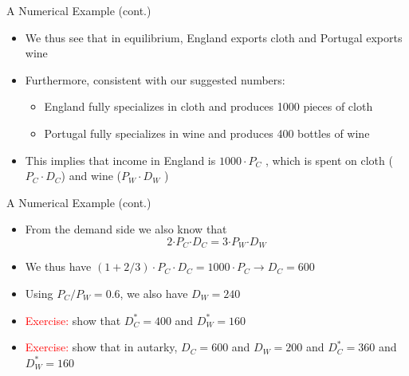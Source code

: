 \documentclass[10pt,hyperref={CJKbookmarks=true},xcolor=dvipsnames,aspectratio=169]{beamer}
\begin{document}
\begin{frame}{A Numerical Example (cont.) }

\begin{itemize}
\item We thus see that in equilibrium, England exports cloth and Portugal
exports wine
\item Furthermore, consistent with our suggested numbers: 

\begin{itemize}
\item England fully specializes in cloth and produces 1000 pieces of cloth 
\item Portugal fully specializes in wine and produces 400 bottles of wine 
\end{itemize}
\item This implies that income in England is $1000\cdot P_{C}$ , which
is spent on cloth ($P_{C}\cdot D_{C}$) and wine ($P_{W}\cdot D_{W}$
) 
\end{itemize}
\end{frame}

\begin{frame}{A Numerical Example (cont.)}

\begin{itemize}
\item From the demand side we also know that 
\[
2\text{·}P_{C}\text{·}D_{C}=3\text{·}P_{W}\text{·}D_{W}
\]

\item We thus have $(1+2/3)\cdot P_{C}\cdot D_{C}=1000\cdot P_{C}\rightarrow D_{C}=600$ 
\item Using $P_{C}/P_{W}=0.6$, we also have $D_{W}=240$ 
\item \textcolor{red}{Exercise:} show that $D_{C}^{*}=400$ and $D_{W}^{*}=160$ 
\item \textcolor{red}{Exercise:} show that in autarky, $D_{C}=600$ and
$D_{W}=200$ and $D_{C}^{*}=360$ and $D_{W}^{*}=160$ 
\end{itemize}
\end{frame}
\end{document}

